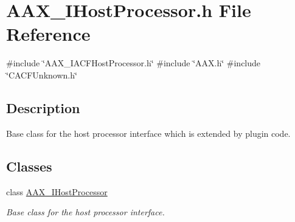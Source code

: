 \hypertarget{a00605}{}\section{A\+A\+X\+\_\+\+I\+Host\+Processor.\+h File Reference}
\label{a00605}
{\ttfamily \#include \char`\"{}A\+A\+X\+\_\+\+I\+A\+C\+F\+Host\+Processor.\+h\char`\"{}}\newline
{\ttfamily \#include \char`\"{}A\+A\+X.\+h\char`\"{}}\newline
{\ttfamily \#include \char`\"{}C\+A\+C\+F\+Unknown.\+h\char`\"{}}\newline


\subsection{Description}
Base class for the host processor interface which is extended by plugin code. 

\subsection*{Classes}
\begin{DoxyCompactItemize}
\item 
class \mbox{\hyperlink{a01833}{A\+A\+X\+\_\+\+I\+Host\+Processor}}
\begin{DoxyCompactList}\small\item\em Base class for the host processor interface. \end{DoxyCompactList}\end{DoxyCompactItemize}
